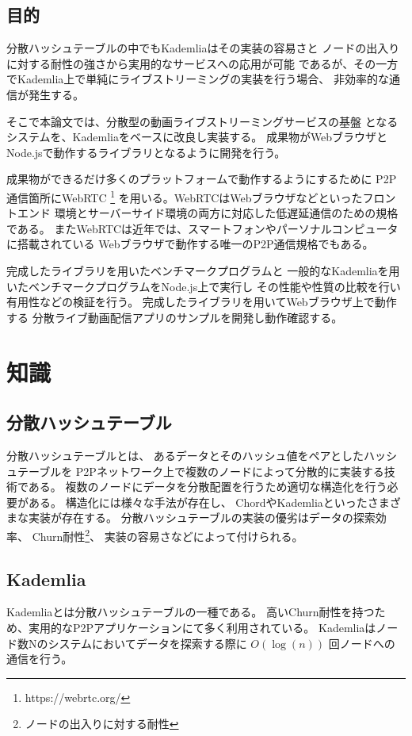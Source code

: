 \documentclass[sotsuron]{jcsie}
\begin{document}
\section{目的}
分散ハッシュテーブルの中でもKademliaはその実装の容易さと
ノードの出入りに対する耐性の強さから実用的なサービスへの応用が可能
であるが、その一方でKademlia上で単純にライブストリーミングの実装を行う場合、
非効率的な通信が発生する。

そこで本論文では、分散型の動画ライブストリーミングサービスの基盤
となるシステムを、Kademliaをベースに改良し実装する。
成果物がWebブラウザとNode.jsで動作するライブラリとなるように開発を行う。

成果物ができるだけ多くのプラットフォームで動作するようにするために
P2P通信箇所にWebRTC \footnote{https://webrtc.org/}
を用いる。WebRTCはWebブラウザなどといったフロントエンド
環境とサーバーサイド環境の両方に対応した低遅延通信のための規格である。
またWebRTCは近年では、スマートフォンやパーソナルコンピュータに搭載されている
Webブラウザで動作する唯一のP2P通信規格でもある。

完成したライブラリを用いたベンチマークプログラムと
一般的なKademliaを用いたベンチマークプログラムをNode.js上で実行し
その性能や性質の比較を行い有用性などの検証を行う。
完成したライブラリを用いてWebブラウザ上で動作する
分散ライブ動画配信アプリのサンプルを開発し動作確認する。


\chapter{知識}
\section{分散ハッシュテーブル}
分散ハッシュテーブルとは、
あるデータとそのハッシュ値をペアとしたハッシュテーブルを
P2Pネットワーク上で複数のノードによって分散的に実装する技術である。
複数のノードにデータを分散配置を行うため適切な構造化を行う必要がある。
構造化には様々な手法が存在し、
ChordやKademliaといったさまざまな実装が存在する。
分散ハッシュテーブルの実装の優劣はデータの探索効率、
Churn耐性\footnote{ノードの出入りに対する耐性}、
実装の容易さなどによって付けられる。

\section{Kademlia}
Kademliaとは分散ハッシュテーブルの一種である。
高いChurn耐性を持つため、実用的なP2Pアプリケーションにて多く利用されている。
Kademliaはノード数Nのシステムにおいてデータを探索する際に
$O(\log(n))$ 回ノードへの通信を行う。
\end{document}
